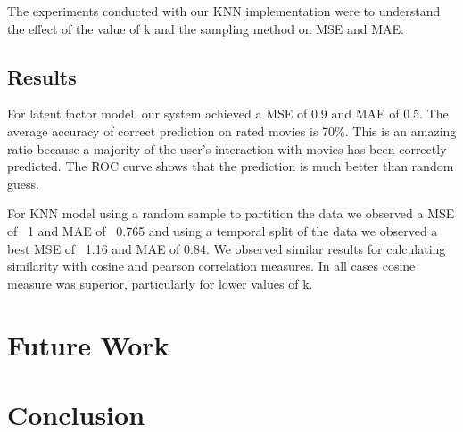 \documentclass[12pt]{article}
\begin{document}
The experiments conducted with our KNN implementation were to understand the effect of the value of k and the sampling method on MSE and MAE.

\subsection{Results}

For latent factor model, our system achieved a MSE of 0.9 and MAE of 0.5. The average accuracy of correct prediction on rated movies is 70\%. This is an amazing ratio because a majority of the user's interaction with movies has been correctly predicted. The ROC curve shows that the prediction is much better than random guess.

For KNN model using a random sample to partition the data we observed a MSE of ~1 and MAE of ~0.765 and using a temporal split of the data we observed a best MSE of ~1.16 and MAE of 0.84. We observed similar results for calculating similarity with cosine and pearson correlation measures. In all cases cosine measure was superior, particularly for lower values of k.
 
\section{Future Work}

\section{Conclusion}

%



\end{document}
